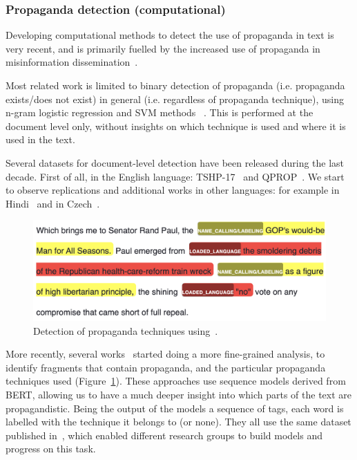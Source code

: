 \subsubsection{Propaganda detection (computational)}
\label{ssec:lit_propaganda_detection}

Developing computational methods to detect the use of propaganda in text is very recent, and is primarily fuelled by the increased use of propaganda in misinformation dissemination~\citep{da2020survey}.

Most related work is limited to binary detection of propaganda (i.e. propaganda exists/does not exist) in general (i.e. regardless of propaganda technique), using n-gram logistic regression and SVM methods ~\citep{rashkin2017truth,barron2019proppy}. This is performed at the document level only, without insights on which technique is used and where it is used in the text.


Several datasets for document-level detection have been released during the last decade.
First of all, in the English language:
TSHP-17~\citep{rashkin2017truth} and
QPROP~\citep{alberto_barron_cedeno_2019_3271522}.
We start to observe replications and additional works in other languages: for example in Hindi~\citep{chaudhari2022h,chaudhari_deptii_2022_5828240}
and in Czech~\citep{baisa2019benchmark}.

\begin{figure}[!htb]
    \centering
    \includegraphics[width=\linewidth]{figures/propaganda_example_1_color.png}
    \caption{Detection of propaganda techniques using~\citet{baly2020we}.%
    }
    \label{fig:propaganda_example_1}
\end{figure}

More recently, several works~\citep{da2019fine,yoosuf2019fine,vorakitphan2022protect} started doing a more fine-grained analysis, to identify fragments that contain propaganda, and the particular propaganda techniques used (Figure~\ref{fig:propaganda_example_1}).
These approaches use sequence models derived from BERT, allowing us to have a much deeper insight into which parts of the text are propagandistic. Being the output of the models a sequence of tags, each word is labelled with the technique it belongs to (or none).
They all use the same dataset published in~\cite{da2019fine}, which enabled different research groups to build models and progress on this task.


